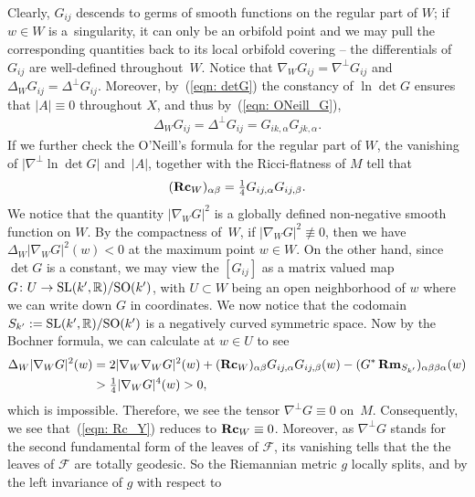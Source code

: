\documentclass[10pt,a4paper]{amsart}
\numberwithin{equation}{section}
\newcommand{\Rm}{\operatorname{\bf Rm}}
\newcommand{\Rc}{\operatorname{\bf Rc}}
\begin{document}
Clearly, $G_{ij}$ descends to germs of smooth functions on the regular part of
$W$; if $w\in W$ is a~singularity, it can only be an orbifold point and we may
pull the corresponding quantities back to its local orbifold covering -- the
differentials of $G_{ij}$ are well-defined throughout~$W$. Notice that
$\nabla_W G_{ij}= \nabla^{\perp}G_{ij}$ and $\Delta_W G_{ij}=
\Delta^{\perp}G_{ij}$. Moreover, by~(\ref{eqn: detG}) the constancy of $\ln
\det G$ ensures that $|A|\equiv 0$ throughout $X$, and thus by~(\ref{eqn:
ONeill_G}),
\begin{align*}%
\Delta_W G_{ij} = \Delta^{\perp}G_{ij} = G_{ik,\alpha}G_{jk,\alpha}.
\end{align*}
If we further check the O'Neill's formula for the regular part of $W$, the
vanishing of $\big|\nabla^{\perp}\ln \det G\big|$ and~$|A|$, together with
the Ricci-flatness of $M$ tell that
\begin{align}\label{eqn: Rc_Y}
 (\Rc_W )_{\alpha\beta} = \tfrac{1}{4}G_{ij,\alpha}G_{ij,\beta}.
 \end{align}
We notice that the quantity $|\nabla_W G|^2$ is a globally defined non-negative
smooth function on $W$. By the compactness of~$W$, if
$\left|\nabla_W G\right|^2\not\equiv 0$, then we have $\Delta_W |\nabla_W
G |^2(w)<0$ at the maximum point $w\in W$. On the other hand, since $\det
G$ is a constant, we may view the $ [G_{ij} ]$ as a matrix valued map $G\colon
U \to {\rm SL}(k',\mathbb{R}) \slash {\rm SO}(k')$, with $U\subset W$ being an open
 neighborhood of $w$ where we can write down $G$ in coordinates. We now notice
 that the codomain $S_{k'}:={\rm SL}(k',\mathbb{R}) \slash {\rm SO}(k')$ is a negatively
 curved symmetric space. Now by the Bochner formula, we can calculate at $w\in
 U$ to see
 \begin{align*}
\Delta_W |\nabla_W G |^2(w)& =
2 |\nabla_W\nabla_W G |^2(w)+
 (\Rc_W )_{\alpha\beta}G_{ij,\alpha}G_{ij,\beta}(w)
- (G^{\ast}\Rm_{S_{k'}} )_{\alpha\beta\beta\alpha}(w)\\
 & >\tfrac{1}{4} |\nabla_W G |^4(w) > 0,
 \end{align*}
 which is impossible. Therefore, we see the tensor $\nabla^{\perp}G\equiv 0$
 on~$M$. Consequently, we see that~(\ref{eqn: Rc_Y}) reduces to
 $\Rc_W \equiv 0$. Moreover, as $\nabla^{\perp}G$ stands for the second
 fundamental form of the leaves of $\mathcal{F}$, its vanishing tells that the
 the leaves of $\mathcal{F}$ are totally geodesic. So the Riemannian
 metric $g$ locally splits, and by the left invariance of $g$ with respect to
\end{document}
